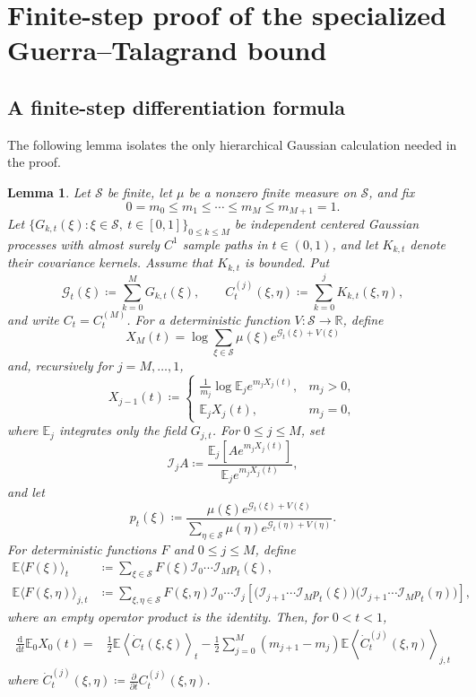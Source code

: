 \documentclass[11pt]{article}
\newtheorem{lemma}[theorem]{Lemma}
\numberwithin{equation}{section}
\newcommand{\E}{\mathbb{E}}
\newcommand{\1}{\mathbf 1}
\begin{document}
\section{Finite-step proof of the specialized Guerra--Talagrand bound}
\label{app:specialGT}



\subsection{A finite-step differentiation formula}

The following lemma isolates the only hierarchical Gaussian calculation
needed in the proof.

\begin{lemma}
\label{lem:finite-step-interpolation-derivative}
Let $\mathcal S$ be finite, let $\mu$ be a nonzero finite measure on
$\mathcal S$, and fix
\[
0=m_0\leq m_1\leq\cdots\leq m_M\leq m_{M+1}=1.
\]
Let $\{G_{k,t}(\xi):\xi\in\mathcal S,\ t\in[0,1]\}_{0\le k\le M}$ be independent centered Gaussian processes with almost surely $C^1$ sample paths in $t \in (0,1)$, and let $K_{k,t}$ denote their covariance kernels. Assume that $K_{k,t}$ is bounded.  Put
\[
\mathcal G_t(\xi) \coloneqq \sum_{k=0}^M G_{k,t}(\xi),
\qquad
C_t^{(j)}(\xi,\eta) \coloneqq \sum_{k=0}^jK_{k,t}(\xi,\eta),
\]
and write $C_t=C_t^{(M)}$. For a deterministic function
$V:\mathcal S\to\mathbb R$, define
\[
X_M(t)=\log\sum_{\xi\in \mathcal S}
\mu(\xi )e^{\mathcal G_t(\xi)+V(\xi)}
\]
and, recursively for $j=M,\ldots,1$,
\[
X_{j-1}(t) \coloneqq
\begin{cases}
\displaystyle
\frac1{m_j}\log\E_j e^{m_jX_j(t)},&m_j>0,\\[3mm]
\E_jX_j(t),&m_j=0,
\end{cases}
\]
where $\E_j$ integrates only the field $G_{j,t}$.  For
$0\leq j\leq M$, set
\[
\mathcal I_jA \coloneqq \frac{\E_j[Ae^{m_jX_j(t)}]}{\E_je^{m_jX_j(t)}},
\]
and let
\[
p_t(\xi) \coloneqq
\frac{\mu(\xi)e^{\mathcal G_t(\xi)+V(\xi)}}
{\sum_{\eta\in\mathcal S}
\mu(\eta)e^{\mathcal G_t(\eta)+V(\eta)}}.
\]
For deterministic functions $F$ and $0\leq j\leq M$, define
\begin{align*}
\E\langle F(\xi) \rangle_t
&\coloneqq \sum_{\xi\in\mathcal S}F(\xi)
\mathcal I_0\cdots\mathcal I_Mp_t(\xi),\\
\E\langle F(\xi,\eta)\rangle_{j,t}
&\coloneqq \sum_{\xi,\eta\in\mathcal S}F(\xi,\eta)
\mathcal I_0\cdots\mathcal I_j\left[
\bigl(\mathcal I_{j+1}\cdots\mathcal I_Mp_t(\xi)\bigr)
\bigl(\mathcal I_{j+1}\cdots\mathcal I_Mp_t(\eta)\bigr)
\right],
\end{align*}
where an empty operator product is the identity.  Then, for $0<t<1$,
\begin{equation}
\begin{aligned}
\frac{\mathrm d}{\mathrm dt} \E_0X_0(t)
={}&\frac1{2}\E\left\langle
\dot C_t(\xi,\xi)
\right\rangle_t-\frac1{2}\sum_{j=0}^M(m_{j+1}-m_j)
\E\left\langle
\dot C_t^{(j)}(\xi,\eta)
\right\rangle_{j,t}
\end{aligned}
\label{eq:finite-step-interpolation-derivative}
\end{equation}
where $\dot C_t^{(j)}(\xi,\eta) \coloneqq \frac{\partial}{\partial t} C_t^{(j)}(\xi,\eta)$.
\end{lemma}
\end{document}
